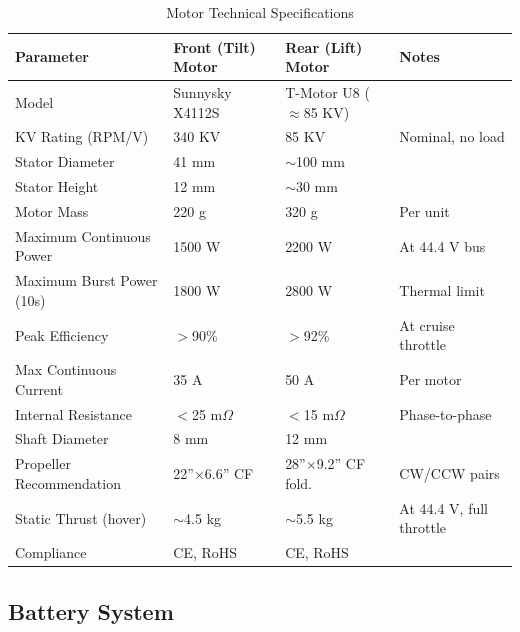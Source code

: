 \begin{table}[H]
\centering
\small
\caption{Motor Technical Specifications}
\begin{tabularx}{\textwidth}{L{4.5cm} C{3cm} C{3cm} X}
\toprule
\textbf{Parameter} &
\textbf{Front (Tilt) Motor} &
\textbf{Rear (Lift) Motor} &
\textbf{Notes} \\
\midrule
Model                    & Sunnysky X4112S & T-Motor U8 ($\approx$85 KV) & \\
KV Rating (RPM/V)        & 340 KV          & 85 KV               & Nominal, no load \\
Stator Diameter          & 41 mm           & $\sim$100 mm        & \\
Stator Height            & 12 mm           & $\sim$30 mm         & \\
Motor Mass               & 220 g           & 320 g               & Per unit \\
Maximum Continuous Power & 1500 W          & 2200 W              & At 44.4 V bus \\
Maximum Burst Power (10s)& 1800 W          & 2800 W              & Thermal limit \\
Peak Efficiency          & $>$90\%         & $>$92\%             & At cruise throttle \\
Max Continuous Current   & 35 A            & 50 A                & Per motor \\
Internal Resistance      & $<$25 m$\Omega$ & $<$15 m$\Omega$     & Phase-to-phase \\
Shaft Diameter           & 8 mm            & 12 mm               & \\
Propeller Recommendation & 22''$\times$6.6'' CF & 28''$\times$9.2'' CF fold. & CW/CCW pairs \\
Static Thrust (hover)    & $\sim$4.5 kg    & $\sim$5.5 kg        & At 44.4 V, full throttle \\
Compliance               & CE, RoHS        & CE, RoHS            & \\
\bottomrule
\end{tabularx}
\end{table}

\subsection{Battery System}

